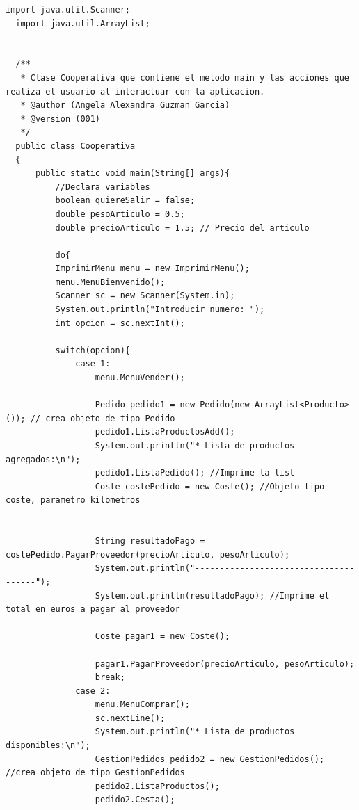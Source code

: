 \documentclass[10pt,a4paper]{article}
\def\StartLineAt#1{\lstset{firstnumber=#1}}
\begin{document}
\StartLineAt{1}
\begin{lstlisting}[style=Java]
  import java.util.Scanner;
  import java.util.ArrayList;
  
  
  /**
   * Clase Cooperativa que contiene el metodo main y las acciones que realiza el usuario al interactuar con la aplicacion.
   * @author (Angela Alexandra Guzman Garcia) 
   * @version (001)
   */
  public class Cooperativa
  {
      public static void main(String[] args){
          //Declara variables
          boolean quiereSalir = false;
          double pesoArticulo = 0.5;
          double precioArticulo = 1.5; // Precio del articulo 
      
          do{
          ImprimirMenu menu = new ImprimirMenu();
          menu.MenuBienvenido();
          Scanner sc = new Scanner(System.in);
          System.out.println("Introducir numero: ");
          int opcion = sc.nextInt();
          
          switch(opcion){
              case 1:
                  menu.MenuVender();
                  
                  Pedido pedido1 = new Pedido(new ArrayList<Producto>()); // crea objeto de tipo Pedido
                  pedido1.ListaProductosAdd();
                  System.out.println("* Lista de productos agregados:\n");
                  pedido1.ListaPedido(); //Imprime la list
                  Coste costePedido = new Coste(); //Objeto tipo coste, parametro kilometros
                  
                  
                  String resultadoPago = costePedido.PagarProveedor(precioArticulo, pesoArticulo);
                  System.out.println("--------------------------------------");
                  System.out.println(resultadoPago); //Imprime el total en euros a pagar al proveedor
  
                  Coste pagar1 = new Coste();
                 
                  pagar1.PagarProveedor(precioArticulo, pesoArticulo);
                  break;
              case 2:
                  menu.MenuComprar();
                  sc.nextLine();
                  System.out.println("* Lista de productos disponibles:\n");
                  GestionPedidos pedido2 = new GestionPedidos(); //crea objeto de tipo GestionPedidos
                  pedido2.ListaProductos();
                  pedido2.Cesta();
                  

\end{lstlisting}
\end{document}

